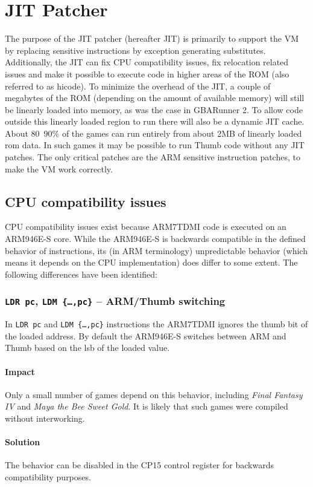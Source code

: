 \documentclass[a4paper,10pt]{report}
\begin{document}
\chapter{JIT Patcher}\label{chap_jit}
	The purpose of the JIT patcher (hereafter JIT) is primarily to support the VM by replacing sensitive instructions by exception generating substitutes. Additionally, the JIT can fix CPU compatibility issues, fix relocation related issues and make it possible to execute code in higher areas of the ROM (also referred to as hicode). To minimize the overhead of the JIT, a couple of megabytes of the ROM (depending on the amount of available memory) will still be linearly loaded into memory, as was the case in GBARunner 2. To allow code outside this linearly loaded region to run there will also be a dynamic JIT cache. About 80~90\% of the games can run entirely from about 2MB of linearly loaded rom data. In such games it may be possible to run Thumb code without any JIT patches. The only critical patches are the ARM sensitive instruction patches, to make the VM work correctly.
	\section{CPU compatibility issues}
	CPU compatibility issues exist because ARM7TDMI code is executed on an ARM946E-S core. While the ARM946E-S is backwards compatible in the defined behavior of instructions, its (in ARM terminology) unpredictable behavior (which means it depends on the CPU implementation) does differ to some extent. The following differences have been identified:
	\subsection{\texttt{LDR pc}, \texttt{LDM \{\dots,pc\}} \--- ARM/Thumb switching}
		In \texttt{LDR pc} and \texttt{LDM \{\dots,pc\}} instructions the ARM7TDMI ignores the thumb bit of the loaded address. By default the ARM946E-S switches between ARM and Thumb based on the lsb of the loaded value.
		
		\subsubsection{Impact}
		Only a small number of games depend on this behavior, including \textit{Final Fantasy IV} and \textit{Maya the Bee Sweet Gold}. It is likely that such games were compiled without interworking.
		
		\subsubsection{Solution}
		The behavior can be disabled in the CP15 control register for backwards compatibility purposes.
		
\end{document}
